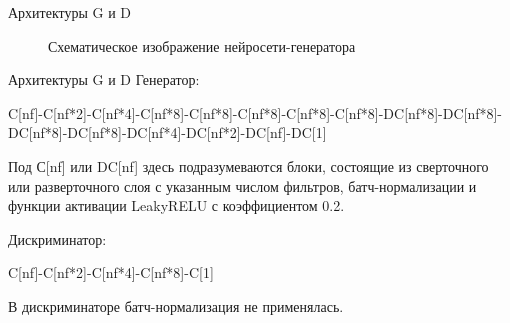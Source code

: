 \documentclass[12pt]{beamer}
\begin{document}
	\begin{frame}{Архитектуры G и D}
		\begin{figure}[h!]
			\vfill
			Схематическое изображение нейросети-генератора
		\end{figure}
	\end{frame}
	
	\begin{frame}{Архитектуры G и D}
		Генератор:
		
		C[nf]-C[nf*2]-C[nf*4]-C[nf*8]-C[nf*8]-C[nf*8]-C[nf*8]-C[nf*8]-DC[nf*8]-DC[nf*8]-DC[nf*8]-DC[nf*8]-DC[nf*4]-DC[nf*2]-DC[nf]-DC[1]
		
		Под С[nf] или DC[nf] здесь подразумеваются блоки, состоящие из сверточного или разверточного слоя с указанным числом фильтров, батч-нормализации и функции активации LeakyRELU с коэффициентом 0.2.
		
		Дискриминатор:
		
		C[nf]-C[nf*2]-C[nf*4]-C[nf*8]-C[1]
		
		В дискриминаторе батч-нормализация не применялась.
	\end{frame}
\end{document}

